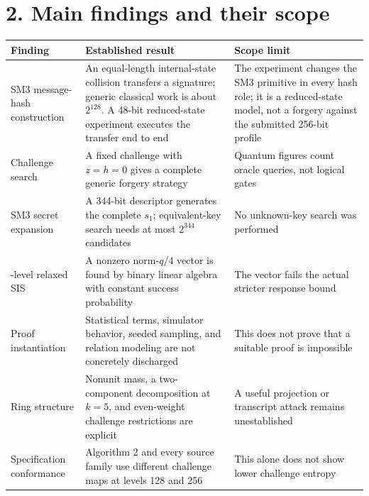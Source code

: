 \documentclass[
  american,
  10pt,
  a4paper,
]{article}
\newcounter{none} %
\begin{document}
\section{2. Main findings and their
scope}\label{main-findings-and-their-scope}

{\def\LTcaptype{none} %
\begin{longtable}[]{@{}
  >{\raggedright\arraybackslash}p{}
  >{\raggedright\arraybackslash}p{}
  >{\raggedright\arraybackslash}p{}@{}}
\toprule\noalign{}
\begin{minipage}[b]{\linewidth}\raggedright
Finding
\end{minipage} & \begin{minipage}[b]{\linewidth}\raggedright
Established result
\end{minipage} & \begin{minipage}[b]{\linewidth}\raggedright
Scope limit
\end{minipage} \\
\midrule\noalign{}
\endhead
\bottomrule\noalign{}
\endlastfoot
SM3 message-hash construction & An equal-length internal-state collision
transfers a signature; generic classical work is about \(2^{128}\). A
48-bit reduced-state experiment executes the transfer end to end & The
experiment changes the SM3 primitive in every hash role; it is a
reduced-state model, not a forgery against the submitted 256-bit
profile \\
Challenge search & A fixed challenge with \(z=h=0\) gives a complete
generic forgery strategy & Quantum figures count oracle queries, not
logical gates \\
SM3 secret expansion & A 344-bit descriptor generates the complete
\(s_1\); equivalent-key search needs at most \(2^{344}\) candidates & No
unknown-key search was performed \\
512-level relaxed SIS & A nonzero norm-\(q/4\) vector is found by binary
linear algebra with constant success probability & The vector fails the
actual stricter response bound \\
Proof instantiation & Statistical terms, simulator behavior, seeded
sampling, and relation modeling are not concretely discharged & This
does not prove that a suitable proof is impossible \\
Ring structure & Nonunit mass, a two-component decomposition at \(k=5\),
and even-weight challenge restrictions are explicit & A useful
projection or transcript attack remains unestablished \\
Specification conformance & Algorithm 2 and every source family use
different challenge maps at levels 128 and 256 & This alone does not
show lower challenge entropy \\
\end{longtable}
}
\end{document}

